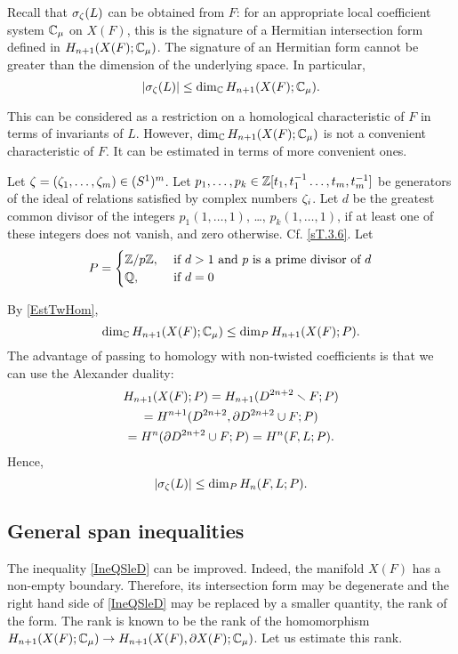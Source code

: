 \documentclass{article}
\numberwithin{equation}{section}
\begin{document}
Recall that $\sigma_\zeta(L)$ can be obtained from $F$: for an appropriate 
local coefficient system $\mathbb C_\mu$ on $X(F)$, this is the signature
of a Hermitian intersection form defined in $H_{n+1}(X(F);\mathbb C_\mu)$.
The signature of an Hermitian form cannot be greater than the 
dimension of the underlying space. In particular, 
\begin{equation}\label{IneQSleD}
|\sigma_\zeta(L)|\le\dim_\mathbb C H_{n+1}(X(F);\mathbb C_\mu).
\end{equation}

This can be considered as a restriction on a homological
characteristic of $F$ in terms of invariants of $L$. However, 
$\dim_\mathbb C H_{n+1}(X(F);\mathbb C_\mu)$ is not a convenient characteristic of $F$.
It can be estimated in terms of more convenient ones.

Let $\zeta=(\zeta_1,\dots,\zeta_m)\in (S^1)^m$. 
Let $p_1,\dots,p_k\in\mathbb Z[t_1,t_1^{-1}\dots,t_m,t_m^{-1}]$ be 
generators of the ideal of relations 
satisfied by complex numbers $\zeta_i$. Let $d$ be the
greatest common divisor of the integers 
$p_1(1,\dots,1)$, \dots, $p_k(1,\dots,1)$, if at least one of these
integers does not vanish, and zero otherwise. Cf. \ref{sT.3.6}. Let 
$$
P=\begin{cases} \mathbb Z/p\mathbb Z, &\text{ if }d>1\text{ and }p\text{ is a prime
divisor of }d\\
\mathbb Q, &\text{ if }d=0 
\end{cases}
$$


By \ref{EstTwHom}, 
$$\dim_\mathbb C H_{n+1}(X(F);\mathbb C_\mu)\le
\dim_{P} H_{n+1}(X(F);P).
$$
The advantage of passing to homology with non-twisted coefficients is 
that we can use the Alexander duality: \begin{multline*}
H_{n+1}(X(F);P)=H_{n+1}(D^{2n+2}\smallsetminus F;P)\\=
H^{n+1}(D^{2n+2},\partial D^{2n+2}\cup F;P)\\=
H^{n}(\partial D^{2n+2}\cup F;P)=
H^n(F,L;P).
\end{multline*}
Hence,
$$|\sigma_\zeta(L)|\le \dim_{P}H_n(F,L;P).
$$ 

\subsection{General span inequalities}\label{s4.3}
The inequality \eqref{IneQSleD} can be improved. Indeed, the manifold 
$X(F)$ has a non-empty boundary. Therefore, its intersection form may be
degenerate and the right hand side of \eqref{IneQSleD} may be replaced by
a smaller quantity, the rank of the form. The rank is known to be
the rank of the homomorphism 
$H_{n+1}(X(F);\mathbb C_\mu)\to H_{n+1}(X(F),\partial X(F);\mathbb C_\mu)$. 
Let us estimate this rank.
\end{document}
